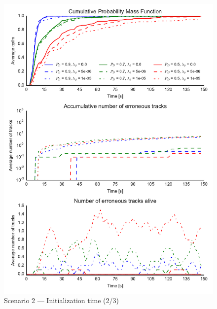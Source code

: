 \begin{figure}
\centering
\includegraphics{Figures/plots/Scenario2_Init-Time(2-3).pdf}
\caption{Scenario 2 --- Initialization time (2/3)}\label{fig:init2_time_2-3}
\end{figure}

